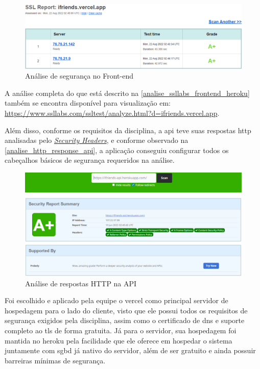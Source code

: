 \begin{figure}[htb]
\centering
\caption{\label{analise_ssllabs_frontend_heroku} Análise de segurança no Front-end}
\includegraphics[width=1\textwidth]{anexos/Imagens_Seguranca/analise_ssllabs_frontend_heroku.png}
\end{figure}
\FloatBarrier

A análise completa do que está descrito na  \autoref{analise_ssllabs_frontend_heroku} também se encontra disponível para visualização em:  \href{https://www.ssllabs.com/ssltest/analyze.html?d=ifriends.vercel.app}{https://www.ssllabs.com/ssltest/analyze.html?d=ifriends.vercel.app}.

Além disso, conforme os requisitos da disciplina, a \acs{api} teve suas respostas \acs{http} analisadas pelo \href{https://securityheaders.io}{\textit{Security Headers}}, e conforme observado na \autoref{analise_http_response_api}, a aplicação conseguiu configurar todos os cabeçalhos básicos de segurança requeridos na análise.

\begin{figure}[htb]
\centering
\caption{\label{analise_http_response_api} Análise de respostas HTTP na API}
\includegraphics[width=1\textwidth]{anexos/Imagens_Seguranca/analise_http_response_api.png}
\end{figure}
\FloatBarrier

Foi escolhido e aplicado pela equipe o \gls{vercel} como principal servidor de hospedagem para o lado do cliente, visto que ele possui todos os requisitos de segurança exigidos pela disciplina, assim como o certificado de \acs{dns} e suporte completo ao \acs{tls} de forma gratuita. Já para o servidor, sua hospedagem foi mantida no \gls{heroku} pela facilidade que ele oferece em hospedar o sistema juntamente com \acs{sgbd} já nativo do servidor, além de ser gratuito e ainda possuir barreiras mínimas de segurança.

